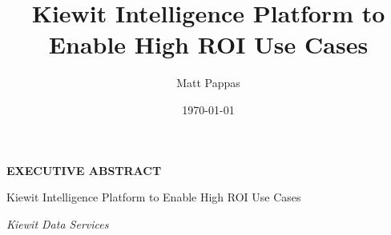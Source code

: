 \documentclass[12pt, a4paper]{article}
\title{Kiewit Intelligence Platform to Enable High ROI Use Cases}
\author{Matt Pappas}
\date{\today}
\begin{document}
\begin{center}

    \vspace{0.5em}

    {\LARGE \bfseries \MakeUppercase{Executive Abstract} \par}

    \vspace{0.25em}

    {\small Kiewit Intelligence Platform to Enable High ROI Use Cases}

    \vspace{0.25em}

    {\small \emph{Kiewit Data Services}}

    \vspace{0.5em}
    
\end{center}
\end{document}
